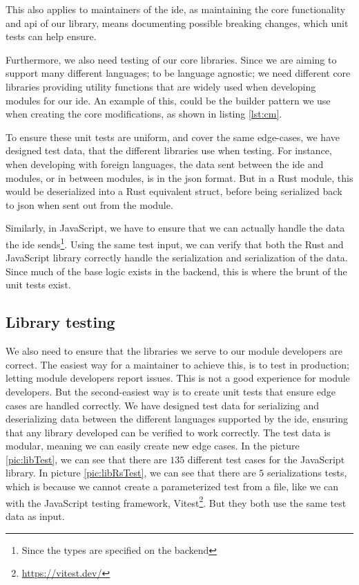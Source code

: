 This also applies to maintainers of the \gls*{ide}, as maintaining the core
functionality and \gls*{api} of our library, means documenting possible breaking
changes, which unit tests can help ensure.

Furthermore, we also need testing of our core libraries. Since we are aiming to
support many different languages; to be language agnostic; we need different core
libraries providing utility functions that are widely used when developing
modules for our \gls{ide}. An example of this, could be the builder pattern we
use when creating the core modifications, as shown in listing \ref{lst:cm}.

To ensure these unit tests are uniform, and cover the same edge-cases, we have
designed test data, that the different libraries use when testing. For instance,
when developing with foreign languages, the data sent between the \gls{ide} and
modules, or in between modules, is in the \gls{json} format. But in a Rust
module, this would be deserialized into a Rust equivalent struct, before being
serialized back to \gls{json} when sent out from the module.

Similarly, in JavaScript, we have to ensure that we can actually handle the data
the \gls{ide} sends\footnote{Since the types are specified on the backend}.
Using the same test input, we can verify that both the Rust and JavaScript
library correctly handle the serialization and serialization of the data. Since
much of the base logic exists in the backend, this is where the brunt of the unit
tests exist.


\subsection{Library testing}

We also need to ensure that the libraries we serve to our module developers
are correct. The easiest way for a maintainer to achieve this, is to test in
production; letting module developers report issues. This is not a good
experience for module developers. But the second-easiest way is to create unit
tests that ensure edge cases are handled correctly. We have designed test data
for serializing and deserializing data between the different languages supported
by the \gls*{ide}, ensuring that any library developed can be verified to work
correctly. The test data is modular, meaning we can easily create new edge
cases. In the picture \ref{pic:libTest}, we can see that there are $135$
different test cases for the JavaScript library. In picture \ref{pic:libRsTest},
we can see that there are $5$ serializations tests, which is because we cannot
create a parameterized test from a file, like we can with the JavaScript testing
framework, Vitest\footnote{\url{https://vitest.dev/}}. But they both use the
same test data as input.

